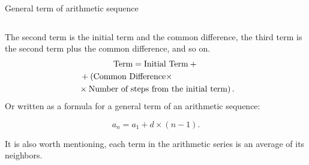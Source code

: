 \documentclass[9pt,aspectratio=169]{beamer}
\begin{document}
\begin{frame}{General term of arithmetic sequence}
\begin{columns}[T]
\begin{column}{0.5\textwidth}
      The second term is the initial term and the common difference, the third term is the second term plus the common difference, and so on.
      \begin{multline*}        
        \text{Term} = \text{Initial Term} + {} \\ {} + \left(\text{Common Difference} \times \hspace*{7em}\right. \\ \left.{} \times \text{Number of steps from the initial term}\right).
      \end{multline*}
      Or written as a formula for a general term of an arithmetic sequence:
      \begin{definition}
        \[ a_n = a_1 + d \times (n - 1). \]
        \vspace*{-0.5\baselineskip}
      \end{definition}
      It is also worth mentioning, each term in the arithmetic series is an average of its neighbors.
    \end{column}
  \end{columns}
\end{frame}
\end{document}
